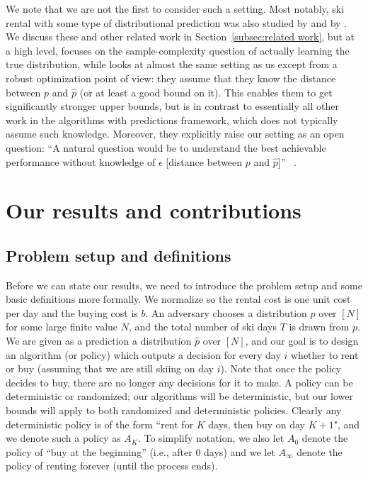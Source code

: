 We note that we are not the first to consider such a setting.  Most notably, ski rental with some type of distributional prediction was also studied by \citet{diakonikolas2021learning} and by \citet{besbes}.  We discuss these and other related work in Section~\ref{subsec:related work}, but at a high level, \citet{diakonikolas2021learning} focuses on the sample-complexity question of actually learning the true distribution, while \citet{besbes} looks at almost the same setting as us except from a robust optimization point of view: they assume that they know the distance between $p$ and $\hat p$ (or at least a good bound on it).  This enables them to get significantly stronger upper bounds, but is in contrast to essentially all other work in the algorithms with predictions framework, which does not typically assume such knowledge.  Moreover, they explicitly raise our setting as an open question: ``A natural question would be to understand the best achievable performance without knowledge of $\epsilon$ [distance between $p$ and $\hat p$]'' ~\cite{besbes}.



\section{Our results and contributions}
\label{sec:our results and contributions}

\subsection{Problem setup and definitions}
Before we can state our results, we need to introduce the problem setup and some basic definitions more formally.  We normalize so the rental cost is one unit cost per day and the buying cost is $b$. An adversary chooses a distribution $p$ over $[N]$ for some large finite value $N$, and the total number of ski days $T$ is drawn from $p$.  We are given as a prediction a distribution $\hat p$ over $[N]$, and our goal is to design an algorithm (or policy) which outputs a decision for every day $i$ whether to rent or buy (assuming that we are still skiing on day $i$).  Note that once the policy decides to buy, there are no longer any decisions for it to make.  A policy can be deterministic or randomized; our algorithms will be deterministic, but our lower bounds will apply to both randomized and deterministic policies.  Clearly any deterministic policy is of the form ``rent for $K$ days, then buy on day $K+1$", and we denote such a policy as $A_K$. To simplify notation, we also let $A_0$ denote the policy of ``buy at the beginning'' (i.e., after $0$ days) and we let $A_\infty$ denote the policy of renting forever (until the process ends). 

